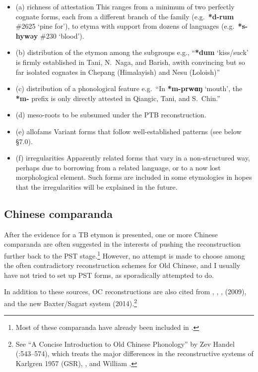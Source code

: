 \begin{itemize}
\item (a) richness of attestation
This ranges from a minimum of two perfectly cognate forms, each from a different branch of the family (e.g.\ \textbf{*d-rum} \#2625 ‘pine for’), to etyma with support from dozens of languages (e.g.\ \textbf{*s-hywǝy} \#230 ‘blood’).
\item (b) distribution of the etymon among the subgroups
e.g., “\textbf{*dum} ‘kiss/suck’ is firmly established in Tani, N.\ Naga, and Barish, awith convincing but so far isolated cognates in Chepang (Himalayish) and Nesu (Loloish)”
\item (c) distribution of a phonological feature
e.g.\ “In \textbf{*m-prwɑŋ} ‘mouth’, the \textbf{*m-} prefix is only directly attested in Qiangic, Tani, and S.\ Chin.”
\item (d) meso-roots to be subsumed under the PTB reconstruction.
\item (e) allofams 
Variant forms that follow well-established patterns (see below \S7.0).
\item (f) irregularities
Apparently related forms that vary in a non-structured way, perhaps due to borrowing from a related language, or to a now lost morphological element. Such forms are included in some etymologies in hopes that the irregularities will be explained in the future.
\end{itemize}

\subsection{Chinese comparanda}

After the evidence for a TB etymon is presented, one or more Chinese comparanda are often suggested in the interests of pushing the reconstruction further back to the PST stage.\footnote{Most of these comparanda have already been included in \textit{}.} However, no attempt is made to choose among the often contradictory reconstruction schemes for Old Chinese, and I usually have not tried to set up PST forms, as \textit{} sporadically attempted to do.

In addition to these sources, OC reconstructions are also cited from \citet{GHC-OCP,GHC-RCC}, \citet{WSC-SH}, \citet{PW-HLY}, \citet{AS-ABCOC} (2009), and the new Baxter/Sagart system (2014).\footnote{See “A Concise Introduction to Old Chinese Phonology” by Zev Handel (\textit{}:543–574), which treats the major differences in the reconstructive systems of Karlgren 1957 (GSR), \citet{LI1976,LI1980}, and William \citet{WHB-OC}.}


